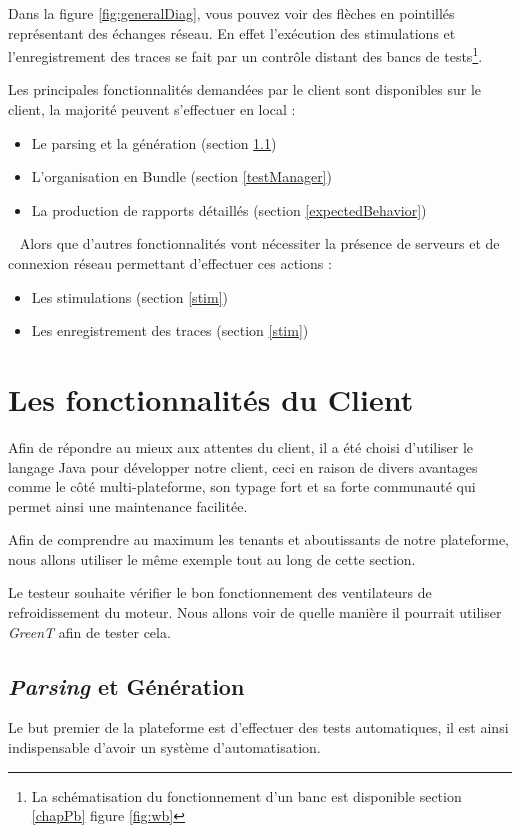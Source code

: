 Dans la figure \ref{fig:generalDiag}, vous pouvez voir des flèches en pointillés représentant des échanges réseau. En effet
l'exécution des stimulations et l'enregistrement des traces se fait par un contrôle distant des bancs de tests\footnote{La
	schématisation du fonctionnement d'un banc est disponible section \ref{chapPb} figure \ref{fig:wb}}.

Les principales fonctionnalités demandées par le client sont disponibles sur le client, la majorité peuvent s'effectuer en local : 
\begin{itemize}
	\item Le parsing et la génération (section \ref{generation})
	\item L'organisation en Bundle (section \ref{testManager})
	\item La production de rapports détaillés (section \ref{expectedBehavior})
\end{itemize}~\newline
Alors que d'autres fonctionnalités vont nécessiter la présence de serveurs et de connexion réseau permettant d'effectuer ces actions
: 
\begin{itemize}
	\item Les stimulations (section \ref{stim})
	\item Les enregistrement des traces (section \ref{stim})
\end{itemize}

\section{Les fonctionnalités du Client}
Afin de répondre au mieux aux attentes du client, il a été choisi d'utiliser le langage Java pour développer notre client, ceci en raison de
divers avantages comme le côté multi-plateforme, son typage fort et sa forte communauté qui permet ainsi une maintenance facilitée. 

\begin{exemple}
Afin de comprendre au maximum les tenants et aboutissants de notre plateforme, nous allons utiliser le même exemple tout au long de cette section.

Le testeur souhaite vérifier le bon fonctionnement des ventilateurs de refroidissement du moteur. Nous allons voir de quelle manière il pourrait utiliser \textit{GreenT} afin de tester cela.
\end{exemple}

\subsection{\textit{Parsing} et Génération}\label{generation}
Le but premier de la plateforme est d'effectuer des tests automatiques, il est ainsi indispensable d'avoir un système d'automatisation.

